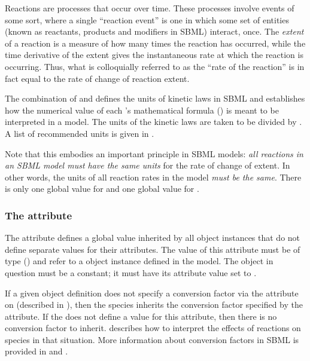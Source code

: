 Reactions are processes that occur over time.  These processes
involve events of some sort, where a single ``reaction event'' is
one in which some set of entities (known as reactants, products
and modifiers in SBML) interact, once.  The \emph{extent} of a
reaction is a measure of how many times the reaction has occurred,
while the time derivative of the extent gives the instantaneous
rate at which the reaction is occurring.  Thus, what is
colloquially referred to as the ``rate of the reaction'' is in
fact equal to the rate of change of reaction extent.

The combination of  and 
defines the units of kinetic laws in SBML and establishes how the
numerical value of each \KineticLaw's mathematical formula
() is meant to be interpreted in a
model.  The units of the kinetic laws are taken to be
 divided by .  A list of
recommended units is given in
.

Note that this embodies an important principle in SBML models:
\emph{all reactions in an SBML model must have the same units} for
the rate of change of extent.  In other words, the units of all
reaction rates in the model \emph{must be the same}.  There is
only one global value for  and one global value
for .

\subsubsection{The  attribute}
\label{sec:model-conversionFactor}

The attribute  defines a global value
inherited by all \Species object instances that do not define
separate values for their  attributes.  The
value of this attribute must be of type 
() and refer to a \Parameter object
instance defined in the model.  The \Parameter object in question
must be a constant; \ie it must have its 
attribute value set to .

If a given \Species object definition does not specify a
conversion factor via the  attribute on
\Species (described in ), then the
species inherits the conversion factor specified by the \Model
{} attribute.  If the \Model does not define
a value for this attribute, then there is no conversion factor to
inherit.   describes how to
interpret the effects of reactions on species in that situation.
More information about conversion factors in SBML is provided in
 and .

